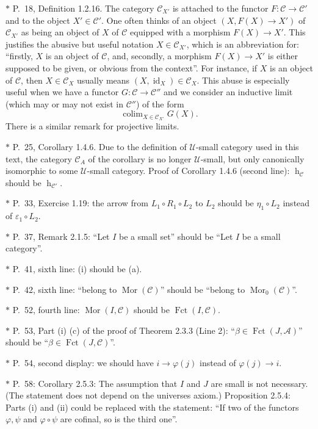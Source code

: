 \documentclass[12pt]{article}%
\theoremstyle{remark}
\theoremstyle{definition}
\newcommand{\oo}{\operatorname}
\newcommand{\A}{\mathcal A}
\newcommand{\C}{\mathcal C}
\newcommand{\U}{\mathcal U}
\DeclareMathOperator*{\colim}{colim}
\DeclareMathOperator{\hy}{h}
\DeclareMathOperator{\id}{id}
\DeclareMathOperator{\Mor}{Mor}
\begin{document}
%

\noindent $*$ P.~18, Definition 1.2.16. The category $\C_{X'}$ is attached to the functor $F:\C\to\C'$ and to the object $X'\in\C'$. One often thinks of an object $(X,F(X)\to X')$ of $\C_{X'}$ as being an object of $X$ of $\C$ equipped with a morphism $F(X)\to X'$. This justifies the abusive but useful notation $X\in\C_{X'}$, which is an abbreviation for: ``firstly, $X$ is an object of $\C$, and, secondly, a morphism $F(X)\to X'$ is either supposed to be given, or obvious from the context''. For instance, if $X$ is an object of $\C$, then $X\in\C_X$ usually means $(X,\id_X)\in\C_X$. This abuse is especially useful when we have a functor $G:\C\to\C''$ and we consider an inductive limit (which may or may not exist in $\C''$) of the form 
%
\begin{equation}\label{convnot}
\colim_{X\in\C_{X'}}G(X).
\end{equation}
%
There is a similar remark for projective limits. 

%

\noindent $*$ P.~25, Corollary 1.4.6. Due to the definition of $\U$-small category used in this text, the category $\C_A$ of the corollary is no longer $\U$-small, but only canonically isomorphic to some $\U$-small category. Proof of Corollary 1.4.6 (second line): $\hy_{\C}$ should be $\hy_{\C'}$. 

\noindent $*$ P.~33, Exercise 1.19: the arrow from $L_1\circ R_1\circ L_2$ to $L_2$ should be $\eta_1\circ L_2$ instead of $\varepsilon_1\circ L_2$. 

\noindent $*$ P.~37, Remark 2.1.5: ``Let $I$ be a small set'' should be ``Let $I$ be a small category''.

\noindent $*$ P.~41, sixth line: (i) should be (a).

\noindent $*$ P.~42, sixth line: ``belong to $\Mor(\C)$'' should be ``belong to $\Mor_0(\C)$''.

\noindent $*$ P.~52, fourth line: $\Mor(I,\C)$ should be $\oo{Fct}(I,\C)$.

\noindent $*$ P.~53, Part (i) (c) of the proof of Theorem 2.3.3 (Line 2): ``$\beta\in\oo{Fct}(J,\A)$'' should be ``$\beta\in\oo{Fct}(J,\C)$''.

\noindent $*$ P.~54, second display: we should have $i\to\varphi(j)$ instead of $\varphi(j)\to i$.

\noindent $*$ P.~58: Corollary 2.5.3: The assumption that $I$ and $J$ are small is not necessary. (The statement does not depend on the universes axiom.) Proposition 2.5.4: Parts (i) and (ii) could be replaced with the statement: ``If two of the functors $\varphi,\psi$ and $\varphi\circ\psi$ are cofinal, so is the third one''.
\end{document}

